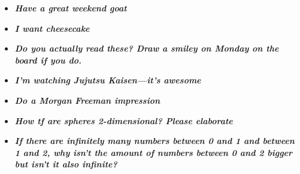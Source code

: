 \documentclass[11pt,letterpaper]{article}
\begin{document}
\begin{itemize}
\item {\bfseries\itshape Have a great weekend goat}
\item {\bfseries\itshape I want cheesecake} 
\item {\bfseries\itshape Do you actually read these? Draw a smiley on Monday on the board if you do.}
\item {\bfseries\itshape I'm watching Jujutsu Kaisen---it's awesome} 
\item {\bfseries\itshape Do a Morgan Freeman impression}  %
%
%


\item {\bfseries\itshape How tf are spheres 2-dimensional? Please elaborate} 
\item {\bfseries\itshape If there are infinitely many numbers between 0 and 1 and between 1 and 2, why isn't the amount of numbers between 0 and 2 bigger but isn't it also infinite?}

\end{itemize}

\newpage
\end{document}
